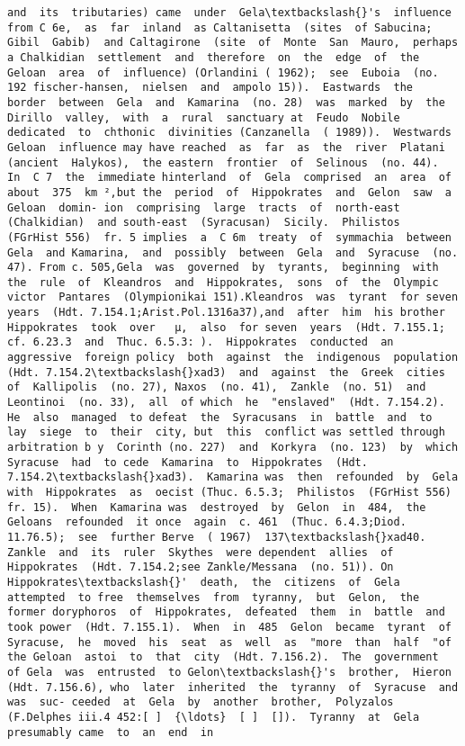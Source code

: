 \documentclass[11pt]{article}
\begin{document}
\begin{Verbatim}[commandchars=\\\{\}]
and  its  tributaries) came  under  Gela\textbackslash{}'s  influence from C 6e,  as  far  inland  as Caltanisetta  (sites  of Sabucina;  Gibil  Gabib)  and Caltagirone  (site  of  Monte  San  Mauro,  perhaps  a Chalkidian  settlement  and  therefore  on  the  edge  of  the Geloan  area  of  influence) (Orlandini ( 1962);  see  Euboia  (no. 192 fischer-hansen,  nielsen  and  ampolo 15)).  Eastwards  the  border  between  Gela  and  Kamarina  (no. 28)  was  marked  by  the  Dirillo  valley,  with  a  rural  sanctuary at  Feudo  Nobile  dedicated  to  chthonic  divinities (Canzanella  ( 1989)).  Westwards  Geloan  influence may have reached  as  far  as  the  river  Platani  (ancient  Halykos),  the eastern  frontier  of  Selinous  (no. 44).  In  C 7  the  immediate hinterland  of  Gela  comprised  an  area  of  about  375  km ²,but the  period  of  Hippokrates  and  Gelon  saw  a  Geloan  domin- ion  comprising  large  tracts  of  north-east  (Chalkidian)  and south-east  (Syracusan)  Sicily.  Philistos  (FGrHist 556)  fr. 5 implies  a  C 6m  treaty  of  symmachia  between  Gela  and Kamarina,  and  possibly  between  Gela  and  Syracuse  (no. 47). From c. 505,Gela  was  governed  by  tyrants,  beginning  with the  rule  of  Kleandros  and  Hippokrates,  sons  of  the  Olympic victor  Pantares  (Olympionikai 151).Kleandros  was  tyrant  for seven  years  (Hdt. 7.154.1;Arist.Pol.1316a37),and  after  him  his brother  Hippokrates  took  over   µ,  also  for seven  years  (Hdt. 7.155.1;  cf. 6.23.3  and  Thuc. 6.5.3: ).  Hippokrates  conducted  an  aggressive  foreign policy  both  against  the  indigenous  population  (Hdt. 7.154.2\textbackslash{}xad3)  and  against  the  Greek  cities  of  Kallipolis  (no. 27), Naxos  (no. 41),  Zankle  (no. 51)  and  Leontinoi  (no. 33),  all  of which  he  "enslaved"  (Hdt. 7.154.2).  He  also  managed  to defeat  the  Syracusans  in  battle  and  to  lay  siege  to  their  city, but  this  conflict was settled through arbitration b y  Corinth (no. 227)  and  Korkyra  (no. 123)  by  which  Syracuse  had  to cede  Kamarina  to  Hippokrates  (Hdt. 7.154.2\textbackslash{}xad3).  Kamarina was  then  refounded  by  Gela  with  Hippokrates  as  oecist (Thuc. 6.5.3;  Philistos  (FGrHist 556)  fr. 15).  When  Kamarina was  destroyed  by  Gelon  in  484,  the  Geloans  refounded  it once  again  c. 461  (Thuc. 6.4.3;Diod.  11.76.5);  see  further Berve  ( 1967)  137\textbackslash{}xad40.  Zankle  and  its  ruler  Skythes  were dependent  allies  of  Hippokrates  (Hdt. 7.154.2;see Zankle/Messana  (no. 51)). On  Hippokrates\textbackslash{}'  death,  the  citizens  of  Gela  attempted  to free  themselves  from  tyranny,  but  Gelon,  the  former doryphoros  of  Hippokrates,  defeated  them  in  battle  and  took power  (Hdt. 7.155.1).  When  in  485  Gelon  became  tyrant  of Syracuse,  he  moved  his  seat  as  well  as  "more  than  half  "of  the Geloan  astoi  to  that  city  (Hdt. 7.156.2).  The  government  of Gela  was  entrusted  to Gelon\textbackslash{}'s  brother,  Hieron  (Hdt. 7.156.6), who  later  inherited  the  tyranny  of  Syracuse  and  was  suc- ceeded  at  Gela  by  another  brother,  Polyzalos  (F.Delphes iii.4 452:[ ]  {\ldots}  [ ]  []).  Tyranny  at  Gela  presumably came  to  an  end  in  
\end{Verbatim}
\end{document}
